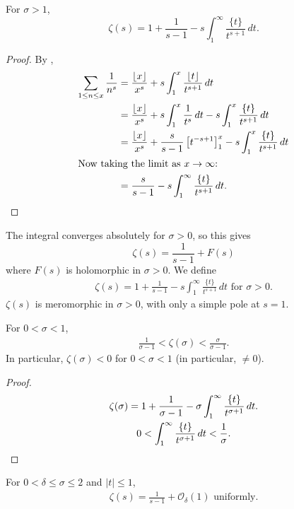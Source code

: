 \documentclass{article}
\newcommand{\1}{\mathbbm{1}}
\newcommand{\bigO}{\mathcal{O}}
\DeclarePairedDelimiter\floor{\lfloor}{\rfloor}
\begin{document}
\begin{lemma}
\newlec
  For $\sigma > 1$,
  \begin{equation*}
    \zeta(s) = 1 + \frac{1}{s-1} - s \int_1^\infty \frac{\{t\}}{t^{s+1}}\,dt.
  \end{equation*}
\end{lemma}
\begin{proof}
  By ,
  \begin{align*}
    \sum_{1 \leq n \leq x} \frac{1}{n^s} &= \frac{\floor{x}}{x^s} + s \int_1^x \frac{\floor{t}}{t^{s+1}}\,dt \\
    &= \frac{\floor{x}}{x^s} + s \int_1^x \frac{1}{t^{s}}\,dt - s \int_1^x \frac{\{t\}}{t^{s+1}}\,dt\\
    &= \frac{\floor{x}}{x^s} + \frac{s}{s-1} \left[t^{-s+1}\right]^x_1 - s \int_1^x \frac{\{t\}}{t^{s+1}}\,dt \\
    \shortintertext{Now taking the limit as $x \to \infty$:}
    &= \frac{s}{s-1} - s \int_1^\infty \frac{\{t\}}{t^{s+1}}\,dt. \qedhere
  \end{align*}
\end{proof}
The integral converges absolutely for $\sigma > 0$, so this gives
\begin{equation*}
  \zeta(s) = \frac{1}{s-1} + F(s)
\end{equation*}
where $F(s)$ is holomorphic in $\sigma>0$.
We define
\begin{align*}
  \zeta(s) = 1 + \frac{1}{s-1} - s \int_1^\infty \frac{\{t\}}{t^{s+1}}\,dt \text{ for } \sigma > 0.
\end{align*}
$\zeta(s)$ is meromorphic in $\sigma>0$, with only a simple pole at $s=1$.
\begin{cor}
  For $0 < \sigma < 1$,
  \begin{align*}
    \frac{1}{\sigma-1} < \zeta(\sigma) < \frac{\sigma}{\sigma-1}.
  \end{align*}
  In particular, $\zeta(\sigma) < 0$ for $0 < \sigma < 1$ (in particular, $\neq 0$).
\end{cor}
\begin{proof}
  \begin{gather*}
    \zeta(\sigma) = 1 + \frac{1}{\sigma-1} - \sigma \int_1^\infty \frac{\{t\}}{t^{\sigma+1}} \, dt. \\
    0 < \int_1^\infty \frac{\{t\}}{t^{\sigma+1}}\,dt < \frac{1}{\sigma}. \qedhere
  \end{gather*}
\end{proof}
\begin{cor}
  For $0 < \delta \leq \sigma \leq 2$ and $|t| \leq 1$,
  \begin{align*}
    \zeta(s) = \frac{1}{s-1} + \bigO_\delta(1) \text{ uniformly}.
  \end{align*}
\end{cor}
\end{document}
